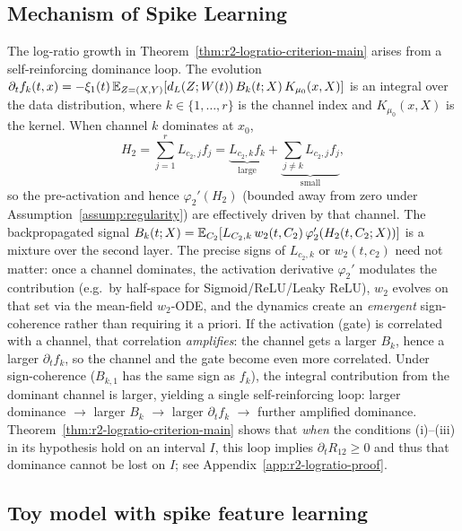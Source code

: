 \documentclass[nohyperref]{article}
\theoremstyle{plain}
\theoremstyle{definition}
\theoremstyle{remark}
\begin{document}
\subsection{Mechanism of Spike Learning}
\label{rem:dominance-mechanism}
The log-ratio growth in Theorem~\ref{thm:r2-logratio-criterion-main} arises from a self-reinforcing dominance loop. The evolution $\partial_t f_k(t,x)=-\xi_1(t)\,\mathbb{E}_{Z=(X,Y)}[d_L(Z;W(t))\,B_k(t;X)\,K_{\mu_0}(x,X)]$ is an integral over the data distribution, where $k\in\{1,\ldots,r\}$ is the channel index and $K_{\mu_0}(x,X)$ is the kernel. When channel $k$ dominates at $x_0$,
\[
H_2 = \sum_{j=1}^r L_{c_2,j}f_j = \underbrace{L_{c_2,k}f_k}_{\text{large}} + \underbrace{\sum_{j \neq k} L_{c_2,j}f_j}_{\text{small}},
\]
so the pre-activation and hence $\varphi_2'(H_2)$ (bounded away from zero under Assumption~\ref{assump:regularity}) are effectively driven by that channel. The backpropagated signal $B_k(t;X)=\mathbb{E}_{C_2}[L_{C_2,k}\,w_2(t,C_2)\,\varphi_2'(H_2(t,C_2;X))]$ is a mixture over the second layer. The precise signs of $L_{c_2,k}$ or $w_2(t,c_2)$ need not matter: once a channel dominates, the activation derivative $\varphi_2'$ modulates the contribution (e.g.\ by half-space for Sigmoid/ReLU/Leaky ReLU), $w_2$ evolves on that set via the mean-field $w_2$-ODE, and the dynamics create an \emph{emergent} sign-coherence rather than requiring it a priori. If the activation (gate) is correlated with a channel, that correlation \emph{amplifies}: the channel gets a larger $B_k$, hence a larger $\partial_t f_k$, so the channel and the gate become even more correlated. Under sign-coherence ($B_{k,1}$ has the same sign as $f_k$), the integral contribution from the dominant channel is larger, yielding a single self-reinforcing loop: larger dominance $\to$ larger $B_k$ $\to$ larger $\partial_t f_k$ $\to$ further amplified dominance. Theorem~\ref{thm:r2-logratio-criterion-main} shows that \emph{when} the conditions (i)--(iii) in its hypothesis hold on an interval $I$, this loop implies $\partial_t R_{12}\ge 0$ and thus that dominance cannot be lost on $I$; see Appendix~\ref{app:r2-logratio-proof}.





\subsection{Toy model with spike feature learning}
\label{sec:fourier-toy}
\end{document}
